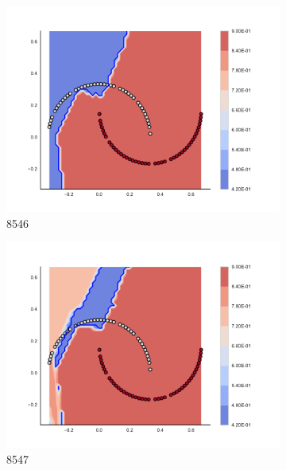 \begin{figure}[h]
\begin{subfigure}[b]{0.09\textwidth}
    \includegraphics[clip, trim=2.35cm 1.75cm 4.5cm 0cm,width=\textwidth]{img/convergence/8546.pdf}
    \caption{8546}
    \label{fig:convergence_8546}
\end{subfigure}
%
\begin{subfigure}[b]{0.09\textwidth}
    \includegraphics[clip, trim=2.35cm 1.75cm 4.5cm 0cm,width=\textwidth]{img/convergence/8547.pdf}
    \caption{8547}
    \label{fig:convergence_8547}
\end{subfigure}
%
\begin{subfigure}[b]{0.09\textwidth}

\end{subfigure}
\end{figure}
